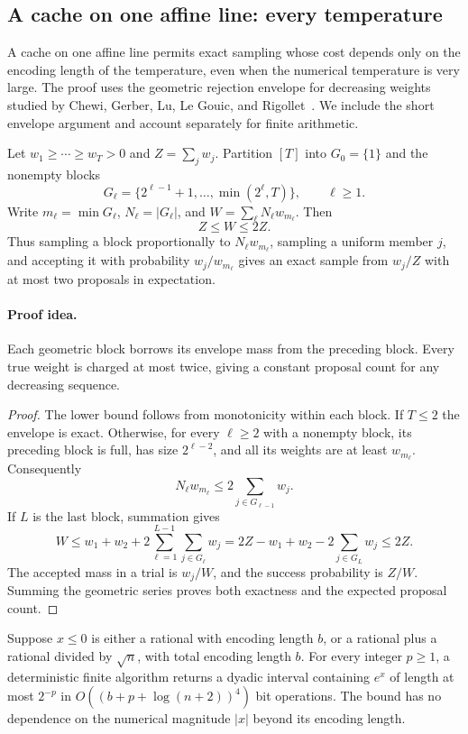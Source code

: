 \subsection{A cache on one affine line: every temperature}
\label{sec:newrankone}

A cache on one affine line permits exact sampling whose cost
depends only on the encoding length of the temperature, even when
the numerical temperature is very large.
The proof uses the geometric rejection envelope for decreasing
weights studied by Chewi, Gerber, Lu, Le Gouic, and
Rigollet~\cite{chewi2022}. We include the short envelope argument
and account separately for finite arithmetic.

\begin{lemma}
\label{lem:newmonotoneenvelope}
Let $w_1\ge\cdots\ge w_T>0$ and $Z=\sum_jw_j$.
Partition $[T]$ into $G_0=\{1\}$ and the nonempty blocks
\[
 G_\ell=\{2^{\ell-1}+1,\ldots,\min(2^\ell,T)\},\qquad\ell\ge1.
\]
Write $m_\ell=\min G_\ell$, $N_\ell=|G_\ell|$, and
$W=\sum_\ell N_\ell w_{m_\ell}$. Then
\[
 Z\le W\le2Z.
\]
Thus sampling a block proportionally to $N_\ell w_{m_\ell}$,
sampling a uniform member $j$, and accepting it with probability
$w_j/w_{m_\ell}$ gives an exact sample from $w_j/Z$ with at most
two proposals in expectation.
\end{lemma}
\paragraph{Proof idea.}
Each geometric block borrows its envelope mass from the preceding block.  Every true weight is charged at most twice, giving a constant proposal count for any decreasing sequence.

\begin{proof}
The lower bound follows from monotonicity within each block. If
$T\le2$ the envelope is exact. Otherwise, for every $\ell\ge2$
with a nonempty block, its preceding block is full, has size
$2^{\ell-2}$, and all its weights are at least $w_{m_\ell}$.
Consequently
\[
 N_\ell w_{m_\ell}
 \le2\sum_{j\in G_{\ell-1}}w_j.
\]
If $L$ is the last block, summation gives
\[
 W\le w_1+w_2+2\sum_{\ell=1}^{L-1}\sum_{j\in G_\ell}w_j
 =2Z-w_1+w_2-2\sum_{j\in G_L}w_j\le2Z.
\]
The accepted mass in a trial is $w_j/W$, and the success
probability is $Z/W$. Summing the geometric series proves both
exactness and the expected proposal count.
\end{proof}

\begin{lemma}
\label{lem:newnegativeexp}
Suppose $x\le0$ is either a rational with encoding length $b$, or
a rational plus a rational divided by $\sqrt n$, with total
encoding length $b$.
For every integer $p\ge1$, a deterministic finite algorithm returns
a dyadic interval containing $e^x$ of length at most $2^{-p}$ in
$O((b+p+\log(n+2))^4)$ bit operations. The bound has no dependence
on the numerical magnitude $|x|$ beyond its encoding length.
\end{lemma}
